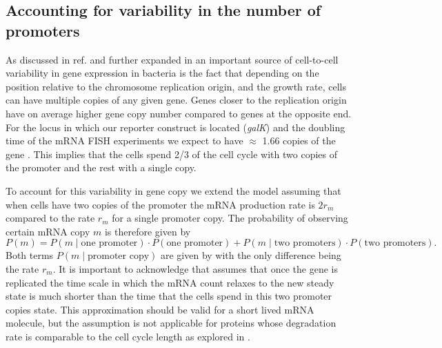 \subsection{Accounting for variability in the number of promoters}

As discussed in ref. \cite{Jones2014a} and further expanded in
\cite{Peterson2015} an important source of cell-to-cell variability in gene
expression in bacteria is the fact that depending on the position relative to
the chromosome replication origin, and the growth rate, cells can have multiple
copies of any given gene. Genes closer to the replication origin have on average
higher gene copy number compared to genes at the opposite end. For the locus in
which our reporter construct is located (\textit{galK}) and the doubling time of
the mRNA FISH experiments we expect to have $\approx$ 1.66 copies of the gene
\cite{Jones2014a, Bremer1996}. This implies that the cells spend 2/3 of the cell
cycle with two copies of the promoter and the rest with a single copy.

To account for this variability in gene copy we extend the model assuming that
when cells have two copies of the promoter the mRNA production rate is $2 r_m$
compared to the rate $r_m$ for a single promoter copy. The probability of
observing certain mRNA copy $m$ is therefore given by
\begin{equation}
  P(m) = P(m \mid \text{one promoter}) \cdot P(\text{one promoter}) +
  P(m \mid \text{two promoters}) \cdot P(\text{two promoters}).
  \label{seq_prob_multipromoter}
\end{equation}
Both terms $P(m \mid \text{promoter copy})$ are given by
 with the only difference being the rate $r_m$. It is
important to acknowledge that  assumes that once
the gene is replicated the time scale in which the mRNA count relaxes to the new
steady state is much shorter than the time that the cells spend in this two
promoter copies state. This approximation should be valid for a short lived mRNA
molecule, but the assumption is not applicable for proteins whose degradation
rate is comparable to the cell cycle length as explored in
.

